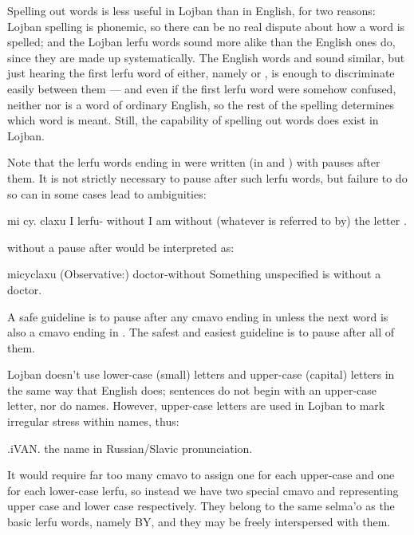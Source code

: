 Spelling out words is less useful in Lojban than in English,
    for two reasons: Lojban spelling is phonemic, so there can be
    no real dispute about how a word is spelled; and the Lojban
    lerfu words sound more alike than the English ones do, since
    they are made up systematically. The English words  and
     sound similar, but just hearing the first lerfu word
    of either, namely  or , is enough to discriminate
    easily between them --- and even if the first lerfu word were
    somehow confused, neither  nor  is a word of
    ordinary English, so the rest of the spelling determines which
    word is meant. Still, the capability of spelling out words does
    exist in Lojban. 

Note that the lerfu words ending in  were written (in
     and ) with pauses after them. It is not strictly necessary
    to pause after such lerfu words, but failure to do so can in
    some cases lead to ambiguities:
\begin{example}
mi cy. claxu\n
I lerfu- without\n
I am without (whatever is referred to by)\n
\T	the letter .
\end{example}

{\noindent}without a pause after  would be interpreted as:
\begin{example}
micyclaxu\n
(Observative:) doctor-without\n
Something unspecified is without a doctor.
\end{example}

A safe guideline is to pause after any cmavo ending in 
    unless the next word is also a cmavo ending in . The
    safest and easiest guideline is to pause after all of them.



Lojban doesn't use lower-case (small) letters and upper-case
    (capital) letters in the same way that English does; sentences
    do not begin with an upper-case letter, nor do names. However,
    upper-case letters are used in Lojban to mark irregular stress
    within names, thus:
\begin{example}
.iVAN.\n
the name  in Russian/Slavic pronunciation.
\end{example}

It would require far too many cmavo to assign one for each
    upper-case and one for each lower-case lerfu, so instead we
    have two special cmavo  and  representing upper
    case and lower case respectively. They belong to the same
    selma'o as the basic lerfu words, namely BY, and they may be
    freely interspersed with them. 

